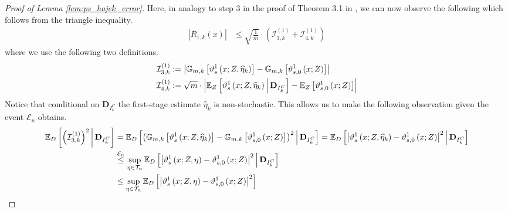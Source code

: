 \begin{proof}[Proof of Lemma \ref{lem:ps_hajek_error}]
    Here, in analogy to step 3 in the proof of Theorem 3.1 in \citet{chernozhukov_doubledebiased_2018}, we can now observe the following which follows from the triangle inequality.
    \begin{equation}
        \begin{aligned}
            \left|\bar{R}_{1, k}\left(x\right)\right|
            & \leq \sqrt{\frac{1}{m}} \cdot \left(\mathcal{I}_{3,k}^{(1)} + \mathcal{I}_{4,k}^{(1)}\right)
        \end{aligned}
    \end{equation}
    where we use the following two definitions.
    \begin{align}
        \mathcal{I}_{3,k}^{(1)} 
        & := \left|\mathbb{G}_{m,k}\left[\vartheta_{s}^{1}\left(x; Z, \widehat{\eta}_{k}\right)\right] 
        - \mathbb{G}_{m,k}\left[\vartheta_{s,0}^{1}\left(x; Z\right) \right]\right|\\
        \mathcal{I}_{4,k}^{(1)} 
        & := \sqrt{m} \cdot \left|
        \mathbb{E}_{Z}\left[\vartheta_{s}^{1}\left(x; Z, \widehat{\eta}_{k}\right) \, \middle| \, \mathbf{D}_{I_{k}^{C}}\right]
        - \mathbb{E}_{Z}\left[\vartheta_{s,0}^{1}\left(x; Z\right) \right]\right|
    \end{align}
    Notice that conditional on $\mathbf{D}_{I_{k}^{C}}$ the first-stage estimate $\hat{\eta}_{k}$ is non-stochastic.
    This allows us to make the following observation given the event $\mathcal{E}_{n}$ obtains.
    \begin{equation}
        \begin{aligned}
            \E_{D}\left[\left(\mathcal{I}_{3,k}^{(1)}\right)^{2} \, \middle| \, \mathbf{D}_{I_{k}^{C}}\right] 
            & = \E_{D}\left[ \left(\mathbb{G}_{m,k}\left[\vartheta_{s}^{1}\left(x; Z, \hat{\eta}_{k}\right)\right] 
            - \mathbb{G}_{m,k}\left[\vartheta_{s,0}^{1}\left(x; Z\right)\right]\right)^{2} \, \middle| \, \mathbf{D}_{I_{k}^{C}}\right]
            = \E_{D}\left[\left|\vartheta_{s}^{1}\left(x; Z, \hat{\eta}_{k}\right) - \vartheta_{s,0}^{1}\left(x; Z\right)\right|^{2}
            \, \middle| \, \mathbf{D}_{I_{k}^{C}}\right]\\
            & \overset{\mathcal{E}_{n}}{\leq} \sup_{\eta \in \mathcal{T}_{n}} 
             \E_{D}\left[\left|\vartheta_{s}^{1}\left(x; Z, \eta\right) - \vartheta_{s,0}^{1}\left(x; Z\right)\right|^{2}
            \, \middle| \, \mathbf{D}_{I_{k}^{C}}\right]\\
            & \leq \sup_{\eta \in \mathcal{T}_{n}} 
             \E_{D}\left[\left|\vartheta_{s}^{1}\left(x; Z, \eta\right) - \vartheta_{s,0}^{1}\left(x; Z\right)\right|^{2}\right]

\end{aligned}
\end{equation}
\end{proof}
